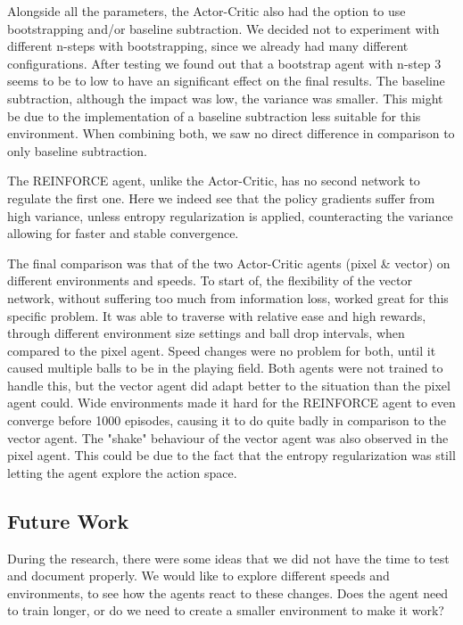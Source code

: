 \documentclass{article}
\begin{document}
Alongside all the parameters, the Actor-Critic also had the option to use bootstrapping and/or baseline subtraction. 
We decided not to experiment with different n-steps with bootstrapping, since we already had many different configurations.
After testing we found out that a bootstrap agent with n-step 3 seems to be to low to have an significant effect on the final results. 
The baseline subtraction, although the impact was low, the variance was smaller. 
This might be due to the implementation of a baseline subtraction less suitable for this environment. 
When combining both, we saw no direct difference in comparison to only baseline subtraction. 

The REINFORCE agent, unlike the Actor-Critic, has no second network to regulate the first one. 
Here we indeed see that the policy gradients suffer from high variance, unless entropy regularization is applied, counteracting the variance allowing for faster and stable convergence. 

The final comparison was that of the two Actor-Critic agents (pixel \& vector) on different environments and speeds.
To start of, the flexibility of the vector network, without suffering too much from information loss, worked great for this specific problem. 
It was able to traverse with relative ease and high rewards, through different environment size settings and ball drop intervals, when compared to the pixel agent.
Speed changes were no problem for both, until it caused multiple balls to be in the playing field. 
Both agents were not trained to handle this, but the vector agent did adapt better to the situation than the pixel agent could. 
Wide environments made it hard for the REINFORCE agent to even converge before 1000 episodes, causing it to do quite badly in comparison to the vector agent.
The "shake" behaviour of the vector agent was also observed in the pixel agent. 
This could be due to the fact that the entropy regularization was still letting the agent explore the action space.  


\subsection{Future Work}
During the research, there were some ideas that we did not have the time to test and document properly.
We would like to explore different speeds and environments, to see how the agents react to these changes.
Does the agent need to train longer, or do we need to create a smaller environment to make it work?
\end{document}
